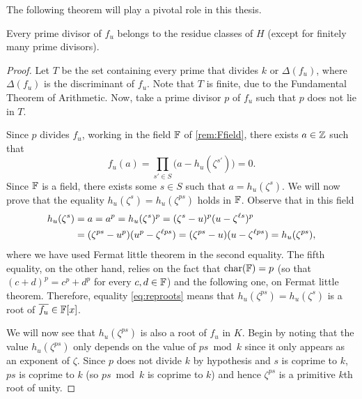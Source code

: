 \documentclass[../main.tex]{subfiles}
\begin{document}
The following theorem will play a pivotal role in this thesis.
\begin{theorem}\label{th:fdivisors}
	Every prime divisor of $f_u$ belongs to the residue classes of $H$ (except for finitely many prime divisors).
\end{theorem}
\begin{proof}
	  Let $T$ be the set containing every prime that divides $k$ or $\Delta(f_u)$, where $\Delta(f_u)$ is the discriminant of $f_u$. Note that $T$ is finite, due to the Fundamental Theorem of Arithmetic. Now, take a prime divisor $p$ of $f_u$ such that $p$ does not lie in $T$.
	  
	  Since $p$ divides $f_u$, working in the field $\mathbb{F}$ of \cref{rem:Ffield}, there exists $a\in\mathbb{Z}$ such that 
	  \begin{equation*}
	  	f_u(a)=\prod_{s'\in S}\big(a-h_u(\zeta^{s'})\big)=0.
	  \end{equation*}
	  Since $\mathbb{F}$ is a field, there exists some $s\in S$ such that $a=h_u(\zeta^{s})$. We will now prove that the equality $h_u(\zeta^s)=h_u(\zeta^{ps})$ holds in $\mathbb{F}$. Observe that in this field
	  \begin{align}\label{eq:reproots}
	  	h_u(\zeta^{s})&=a=a^p=h_u(\zeta^{s})^p=(\zeta^{s}-u)^p(u-\zeta^{\ell s})^p\notag\\ 
	  	&=(\zeta^{ps}-u^p)(u^p-\zeta^{\ell ps})=(\zeta^{ps}-u)(u-\zeta^{\ell ps})=h_u(\zeta^{ps}),
	  \end{align}
	  where we have used Fermat little theorem in the second equality. The fifth equality, on the other hand, relies on the fact that $\operatorname{char}(\mathbb{F})=p$ (so that $(c+d)^p=c^p+d^p$ for every $c,d \in \mathbb{F}$) and the following one, on Fermat little theorem. Therefore, equality \cref{eq:reproots} means that $h_u(\zeta^{ps})=h_u(\zeta^{s})$ is a root of $\overline{f_u}\in\mathbb{F}[x]$.
	  
	  We will now see that $h_u(\zeta^{ps})$ is also a root of $f_u$ in $K$. Begin by noting that the value $h_u(\zeta^{ps})$ only depends on the value of $ps \bmod{k}$ since it only appears as an exponent of $\zeta$. Since $p$ does not divide $k$ by hypothesis and $s$ is coprime to $k$, $ps$ is coprime to $k$ (so $ps \bmod{k}$ is coprime to $k$) and hence $\zeta^{ps}$ is a primitive $k$th root of unity.
	  

\end{proof}
\end{document}
